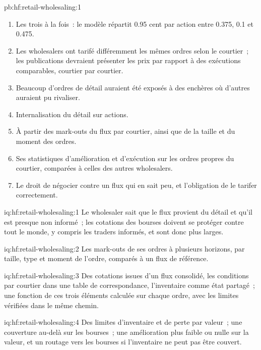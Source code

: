 \begin{solution}{pb:hf:retail-wholesaling:1}
\begin{enumerate}
reçoit 0.375 cent par action pour une fourchette affichée de 2.5 cents (E/Q de 0.70).
\item Les trois à la fois~: le modèle répartit 0.95 cent par action entre 0.375, 0.1 et 0.475.
\item Les wholesalers ont tarifé différemment les mêmes ordres selon le courtier~; les publications devraient présenter les prix par rapport à des exécutions comparables, courtier par courtier.
\item Beaucoup d'ordres de détail auraient été exposés à des enchères où d'autres auraient pu rivaliser.
\item Internalisation du détail sur actions.
\item À partir des mark-outs du flux par courtier, ainsi que de la taille et du moment des ordres.
\item Ses statistiques d'amélioration et d'exécution sur les ordres propres du courtier, comparées à celles des autres wholesalers.
\item Le droit de négocier contre un flux qui en sait peu, et l'obligation de le tarifer correctement.
\end{enumerate}
\end{solution}

\begin{solution}{iq:hf:retail-wholesaling:1}
Le wholesaler sait que le flux provient du détail et qu'il est presque non informé~; les cotations des bourses doivent se protéger contre tout le monde, y compris les traders informés, et
sont donc plus larges.
\end{solution}

\begin{solution}{iq:hf:retail-wholesaling:2}
Les mark-outs de ses ordres à plusieurs horizons, par taille, type et moment de l'ordre, comparés à un flux de référence.
\end{solution}

\begin{solution}{iq:hf:retail-wholesaling:3}
Des cotations issues d'un flux consolidé, les conditions par courtier dans une table de correspondance, l'inventaire comme état partagé~; une fonction de ces trois éléments calculée sur chaque ordre,
avec les limites vérifiées dans le même chemin.
\end{solution}

\begin{solution}{iq:hf:retail-wholesaling:4}
Des limites d'inventaire et de perte par valeur~; une couverture au-delà sur les bourses~; une amélioration plus faible ou nulle sur la valeur, et un routage vers les bourses si
l'inventaire ne peut pas être couvert.
\end{solution}

